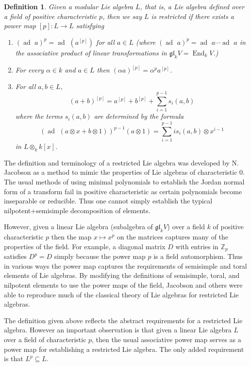 \documentclass[12pt]{article}
\DeclareMathOperator{\End}{End}
\DeclareMathOperator{\ad}{ad~}
\newtheorem{defn}[thm]{Definition}
\begin{document}
\begin{defn}
Given a modular Lie algebra $L$, that is, a Lie algebra defined over a field of
positive characteristic $p$, then we say $L$ is \emph{restricted} if there
exists a \emph{power map} $[p]:L\rightarrow L$ satisfying
\begin{enumerate}
\item $(\ad a)^p=\ad (a^{[p]})$ for all $a\in L$ (where $(\ad a)^p=\ad a\cdots \ad a$ in the associative product of linear transformations in $\mathfrak{gl}_k V=\End_k V$.)
\item For every $\alpha\in k$ and $a\in L$ then $(\alpha a)^{[p]}=\alpha^p a^{[p]}$.
\item For all $a,b\in L$,
\[(a+b)^{[p]}=a^{[p]}+b^{[p]}+\sum_{i=1}^{p-1} s_i(a,b)\]
where the terms $s_i(a,b)$ are determined by the formula
\[(\ad (a\otimes x+b\otimes 1))^{p-1} (a\otimes 1)
=\sum_{i=1}^{p-1} i s_i(a,b)\otimes x^{i-1}\]
in $L\otimes_k k[x]$.
\end{enumerate} 
\end{defn}

The definition and terminology of a restricted Lie algebra was developed by 
N. Jacobson as a method to mimic the properties of Lie algebras of characteristic 0.  The usual methods of using minimal polynomials to establish
the Jordan normal form of a transform fail in positive characteristic as
certain polynomials become inseparable or reducible.  Thus one cannot
simply establish the typical nilpotent+semisimple decomposition of elements. 

However, given a linear Lie algebra (subalgebra of $\mathfrak{gl}_k V$) over a field $k$ of positive characteristic $p$ then the map $x\mapsto x^p$ on the matrices captures many of the properties of the field.  For example, a diagonal
matrix $D$ with entries in $\mathbb{Z}_p$ satisfies $D^p=D$ simply because 
the power map $p$ is a field automorphism.  Thus in various ways the power
map captures the requirements of semisimple and toral elements of Lie
algebras.  By modifying the definitions of semisimple, toral, and nilpotent
elements to use the power maps of the field, Jacobson and others were able to
reproduce much of the classical theory of Lie algebras for restricted Lie algebras.

The definition given above reflects the abstract requirements for a restricted Lie algebra.  However an important observation is that given a linear Lie algebra $L$ over a field of characteristic $p$, then the usual associative power map serves as a power map for establishing a restricted Lie algebra.  The only added requirement is that $L^p\subseteq L$.
\end{document}
